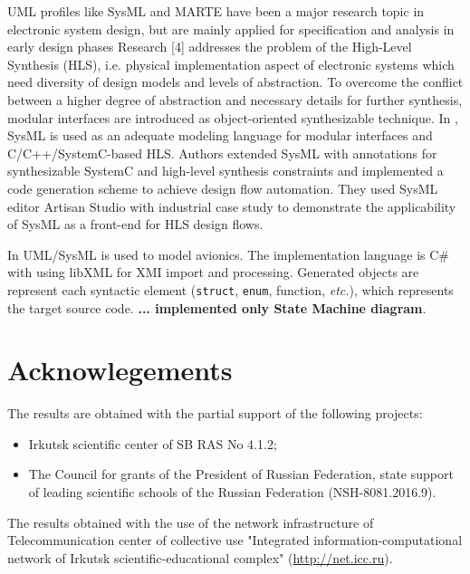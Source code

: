\documentclass{llncs}
\begin{document}
UML profiles like SysML and MARTE have been a major research topic in electronic system design, but are mainly applied for specification and analysis in early design phases Research [4] addresses the problem of the High-Level Synthesis (HLS), i.e. physical implementation aspect of electronic systems which need diversity of design models and levels of abstraction.  To overcome the conflict between a higher degree of abstraction and necessary details for further synthesis, modular interfaces are introduced as object-oriented synthesizable technique. In \cite{mish},  SysML is used as an adequate modeling language for modular interfaces and C/C++/SystemC-based HLS. Authors extended SysML with annotations for synthesizable SystemC and high-level synthesis constraints and implemented a code generation scheme to achieve design flow automation. They used SysML editor Artisan Studio with industrial case study to demonstrate the applicability of SysML as a front-end for HLS design flows.

In \cite{tom16} UML/SysML is used to model avionics.  The implementation language is C\# with using libXML for XMI import and processing.  Generated objects are represent each syntactic element (\texttt{struct}, \texttt{enum}, function, \emph{etc.}), which represents the target source code.  \textbf{... implemented only State Machine diagram}.

\cite{fab}






\section{Acknowlegements}
\label{sec:acks}

The results are obtained with the partial support of the following projects:
\begin{itemize}
\item Irkutsk scientific center of SB RAS No 4.1.2;
\item The Council for grants of the President of Russian Federation, state support of leading scientific schools of the Russian Federation (NSH-8081.2016.9). %
\end{itemize}
The results obtained with the use of the network infrastructure of Telecommunication center of collective use "Integrated information-computational network of Irkutsk scientific-educational complex" (\url{http://net.icc.ru}).
\end{document}

